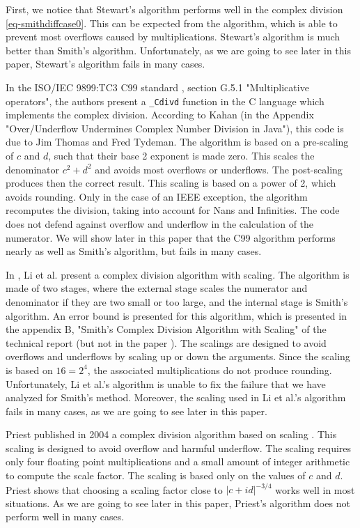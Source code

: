 \documentclass{paper}
\begin{document}
First, we notice that Stewart's algorithm performs well in the 
complex division \ref{eq-smithdiffcase0}. 
This can be expected from the algorithm, which is able to prevent 
most overflows caused by multiplications. 
Stewart's algorithm is much better than Smith's algorithm. 
Unfortunately, as we are going to see later in this paper, 
Stewart's algorithm fails in many cases.

In the ISO/IEC 9899:TC3 C99 standard \cite{ProgrammingC}, 
section G.5.1 "Multiplicative operators", the authors present a \verb|_Cdivd| function 
in the C language which implements the complex division. 
According to Kahan \cite{KahanMarketing2000} (in the Appendix "Over/Underflow Undermines 
Complex Number Division in Java"), this code is due to Jim Thomas and Fred Tydeman. 
The algorithm is based on a pre-scaling of $c$ and $d$, such that their 
base 2 exponent is made zero. 
This scales the denominator $c^2+d^2$ and avoids most overflows or underflows. 
The post-scaling produces then the correct result. 
This scaling is based on a power of 2, which avoids rounding. 
Only in the case of an IEEE exception, the algorithm recomputes the division, 
taking into account for Nans and Infinities. 
The code does not defend against overflow and underflow in the calculation of the numerator.
We will show later in this paper that the C99 algorithm performs 
nearly as well as Smith's algorithm, but fails in many cases.

In \cite{567808}, Li et al. present a complex division algorithm with scaling. 
The algorithm is made of two stages, where the external stage 
scales the numerator and denominator if they are two small 
or too large, and the internal stage is Smith's algorithm. 
An error bound is presented for this algorithm, which is presented 
in the appendix B, "Smith's Complex Division Algorithm with Scaling" of the 
technical report \cite{Li2000} (but not in the paper \cite{567808}).
The scalings are designed to avoid overflows and underflows by scaling 
up or down the arguments. 
Since the scaling is based on $16=2^4$, the associated 
multiplications do not produce rounding. 
Unfortunately, Li et al.'s algorithm is unable to fix the failure that 
we have analyzed for Smith's method. 
Moreover, the scaling used in Li et al.'s algorithm  
fails in many cases, as we are going to see later in 
this paper. 

Priest published in 2004 a complex 
division algorithm based on scaling \cite{1039814}. 
This scaling is designed to avoid overflow and harmful underflow. 
The scaling requires only four floating point multiplications and 
a small amount of integer arithmetic to compute the scale 
factor. 
The scaling is based only on the values of $c$ and $d$. 
Priest shows that choosing a scaling factor close to $|c+id|^{-3/4}$ works 
well in most situations. 
As we are going to see later in this paper, Priest's algorithm 
does not perform well in many cases. 
\end{document}
